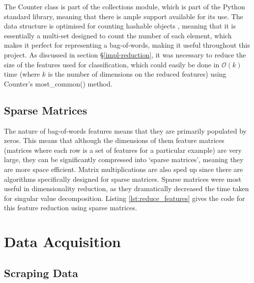 \documentclass[12pt,a4paper,twoside,openright]{report}
\begin{document}
The Counter class is part of the collections module, which is part of the Python standard library, meaning that there is ample support available for its use. The data structure is optimised for counting hashable objects \cite{pythoncollectionsdocs}, meaning that it is essentially a multi-set designed to count the number of each element, which makes it perfect for representing a bag-of-words, making it useful throughout this project. As discussed in section \S\ref{impl-reduction}, it was necessary to reduce the size of the features used for classification, which could easily be done in $\mathcal{O}(k)$ time (where $k$ is the number of dimensions on the reduced features) using Counter's most\_common() method.

\subsection{Sparse Matrices}

The nature of bag-of-words features means that they are primarily populated by zeros. This means that although the dimensions of them feature matrices (matrices where each row is a set of features for a particular example) are very large, they can be significantly compressed into `sparse matrices', meaning they are more space efficient. Matrix multiplications are also sped up since there are algorithms specifically designed for sparse matrices. Sparse matrices were most useful in dimensionality reduction, as they dramatically decreased the time taken for singular value decomposition. Listing \ref{lst:reduce_features} gives the code for this feature reduction using sparse matrices.

\section{Data Acquisition} \label{impl-acquisition}
\subsection{Scraping Data} \label{impl-scraping}
\end{document}

